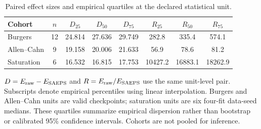 \begin{table}[!htbp]
\centering
\caption{Paired effect sizes and empirical quartiles at the declared statistical unit.}
\label{tab:effect_sizes}
\small
\setlength{\tabcolsep}{4pt}
\begin{tabular}{l S[table-format=2.0] *{3}{S[table-format=2.3]} *{3}{S[table-format=5.1]}}
\toprule
{Cohort} & {$n$} & {$D_{25}$} & {$D_{50}$} & {$D_{75}$} & {$R_{25}$} & {$R_{50}$} & {$R_{75}$} \\
\midrule
Burgers & 12 & 24.814 & 27.636 & 29.749 & 282.8 & 335.4 & 574.1 \\
Allen--Cahn & 9 & 19.158 & 20.006 & 21.633 & 56.9 & 78.6 & 81.2 \\
Saturation & 6 & 16.532 & 16.815 & 17.753 & 10427.2 & 16883.1 & 18262.9 \\
\bottomrule
\end{tabular}
\par\vspace{3pt}\begin{minipage}{.98\linewidth}\footnotesize $D=E_{\rm raw}-E_{\rm SAEPS}$ and $R=E_{\rm raw}/E_{\rm SAEPS}$ use the same unit-level pair. Subscripts denote empirical percentiles using linear interpolation. Burgers and Allen--Cahn units are valid checkpoints; saturation units are six four-fit data-seed medians. These quartiles summarize empirical dispersion rather than bootstrap or calibrated 95\% confidence intervals. Cohorts are not pooled for inference.\end{minipage}
\end{table}
